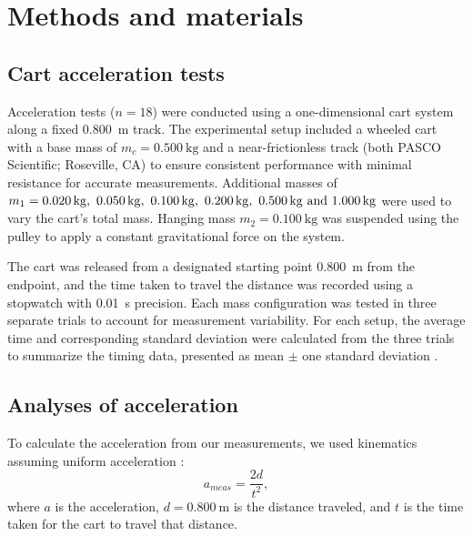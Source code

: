 ﻿\documentclass[reprint,amsmath,amssymb,prl]{revtex4-2}
\begin{document}
\section{Methods and materials}

\subsection{Cart acceleration tests}
Acceleration tests ($n=18$) were conducted using a one-dimensional cart system along a fixed \qty{0.800}{\meter} track. The experimental setup included a wheeled cart with a base mass of $m_c=\qty{0.500}{\kilo\gram}$ and a near-frictionless track (both PASCO Scientific; Roseville, CA) to ensure consistent performance with minimal resistance for accurate measurements. Additional masses of $m_1=\qtylist{0.020;0.050;0.100;0.200;0.500;1.000}{\kilo\gram}$ were used to vary the cart’s total mass. Hanging mass $m_2=\qty{0.100}{\kilo\gram}$ was suspended using the pulley to apply a constant gravitational force on the system. 

The cart was released from a designated starting point \qty{0.800}{\meter} from the endpoint, and the time taken to travel the distance was recorded using a stopwatch with \qty{0.01}{\second} precision. Each mass configuration was tested in three separate trials to account for measurement variability. For each setup, the average time and corresponding standard deviation were calculated from the three trials to summarize the timing data, presented as mean $\pm$ one standard deviation \cite{starnes2015practice}.


\subsection{Analyses of acceleration}

To calculate the acceleration from our measurements, we used kinematics assuming uniform acceleration \cite{knight2017physics}:  
\begin{equation}
a_{meas} = \dfrac{2d}{t^2},
\label{eq:ameas}
\end{equation}
where $a$ is the acceleration, $d=\qty{0.800}{\meter}$ is the distance traveled, and $t$ is the time taken for the cart to travel that distance. %
\end{document}
